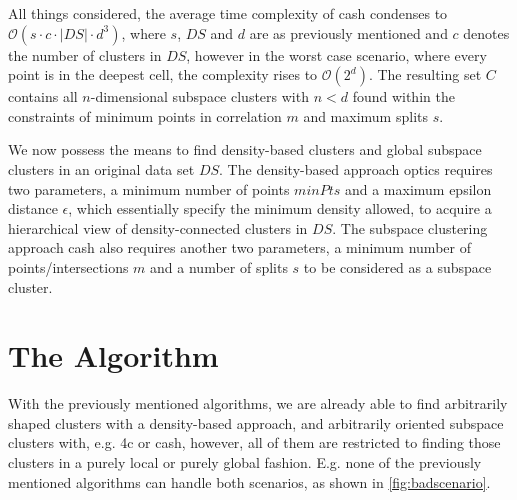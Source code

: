 All things considered, the average time complexity of \gls{cash} condenses to $\mathcal{O}(s \cdot c \cdot |DS| \cdot d^3)$, where $s$, $DS$ and $d$ are as previously mentioned and $c$ denotes the number of clusters in $DS$, however in the worst case scenario, where every point is in the deepest cell, the complexity rises to $\mathcal{O}(2^d)$. The resulting set $C$ contains all $n$-dimensional subspace clusters with $n < d$ found within the constraints of minimum points in correlation $m$ and maximum splits $s$.\\

We now possess the means to find density-based clusters and global subspace clusters in an original data set $DS$. The density-based approach \gls{optics} requires two parameters, a minimum number of points $minPts$ and a maximum epsilon distance $\epsilon$, which essentially specify the minimum density allowed, to acquire a hierarchical view of density-connected clusters in $DS$. The subspace clustering approach \gls{cash} also requires another two parameters, a minimum number of points/intersections $m$ and a number of splits $s$ to be considered as a subspace cluster.

\section{The Algorithm}
With the previously mentioned algorithms, we are already able to find arbitrarily shaped clusters with a density-based approach, and arbitrarily oriented subspace clusters with, e.g. \gls{4c} or \gls{cash}, however, all of them are restricted to finding those clusters in a purely local or purely global fashion. E.g. none of the previously mentioned algorithms can handle both scenarios, as shown in \autoref{fig:badscenario}.

